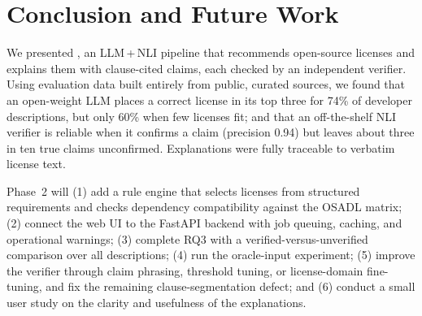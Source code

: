 \section{Conclusion and Future Work}
\label{s:conclusion}

We presented \sys{}, an LLM\,+\,NLI pipeline that recommends open-source licenses and explains them with clause-cited claims, each checked by an independent verifier. Using evaluation data built entirely from public, curated sources, we found that an open-weight LLM places a correct license in its top three for 74\% of developer descriptions, but only 60\% when few licenses fit; and that an off-the-shelf NLI verifier is reliable when it confirms a claim (precision 0.94) but leaves about three in ten true claims unconfirmed. Explanations were fully traceable to verbatim license text.

Phase~2 will (1) add a rule engine that selects licenses from structured requirements and checks dependency compatibility against the OSADL matrix; (2) connect the web UI to the FastAPI backend with job queuing, caching, and operational warnings; (3) complete RQ3 with a verified-versus-unverified comparison over all descriptions; (4) run the oracle-input experiment; (5) improve the verifier through claim phrasing, threshold tuning, or license-domain fine-tuning, and fix the remaining clause-segmentation defect; and (6) conduct a small user study on the clarity and usefulness of the explanations.
